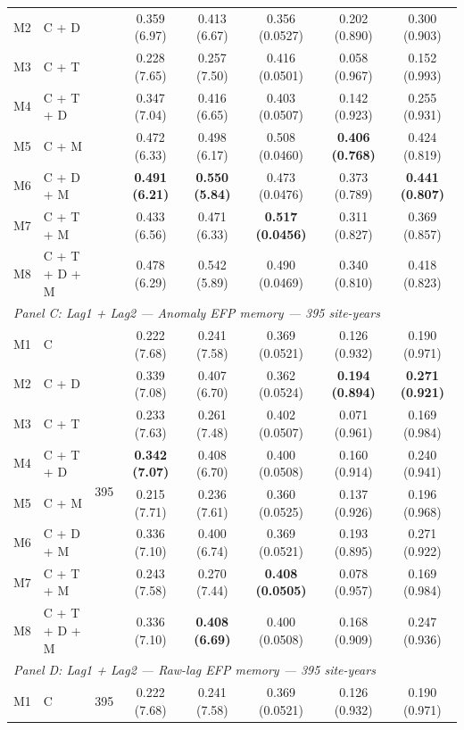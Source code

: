 \begin{table}[htbp]
\begin{tabular}{llcccccc}
M2 & C + D &  & 0.359 (6.97) & 0.413 (6.67) & 0.356 (0.0527) & 0.202 (0.890) & 0.300 (0.903) \\
M3 & C + T &  & 0.228 (7.65) & 0.257 (7.50) & 0.416 (0.0501) & 0.058 (0.967) & 0.152 (0.993) \\
M4 & C + T + D &  & 0.347 (7.04) & 0.416 (6.65) & 0.403 (0.0507) & 0.142 (0.923) & 0.255 (0.931) \\
M5 & C + M &  & 0.472 (6.33) & 0.498 (6.17) & 0.508 (0.0460) & \textbf{0.406 (0.768)} & 0.424 (0.819) \\
M6 & C + D + M &  & \textbf{0.491 (6.21)} & \textbf{0.550 (5.84)} & 0.473 (0.0476) & 0.373 (0.789) & \textbf{0.441 (0.807)} \\
M7 & C + T + M &  & 0.433 (6.56) & 0.471 (6.33) & \textbf{0.517 (0.0456)} & 0.311 (0.827) & 0.369 (0.857) \\
M8 & C + T + D + M &  & 0.478 (6.29) & 0.542 (5.89) & 0.490 (0.0469) & 0.340 (0.810) & 0.418 (0.823) \\
\midrule
\multicolumn{8}{l}{\textit{Panel C: Lag1 + Lag2 --- Anomaly EFP memory --- 395 site-years}} \\
\midrule
M1 & C & \multirow{8}{*}{395} & 0.222 (7.68) & 0.241 (7.58) & 0.369 (0.0521) & 0.126 (0.932) & 0.190 (0.971) \\
M2 & C + D &  & 0.339 (7.08) & 0.407 (6.70) & 0.362 (0.0524) & \textbf{0.194 (0.894)} & \textbf{0.271 (0.921)} \\
M3 & C + T &  & 0.233 (7.63) & 0.261 (7.48) & 0.402 (0.0507) & 0.071 (0.961) & 0.169 (0.984) \\
M4 & C + T + D &  & \textbf{0.342 (7.07)} & 0.408 (6.70) & 0.400 (0.0508) & 0.160 (0.914) & 0.240 (0.941) \\
M5 & C + M &  & 0.215 (7.71) & 0.236 (7.61) & 0.360 (0.0525) & 0.137 (0.926) & 0.196 (0.968) \\
M6 & C + D + M &  & 0.336 (7.10) & 0.400 (6.74) & 0.369 (0.0521) & 0.193 (0.895) & 0.271 (0.922) \\
M7 & C + T + M &  & 0.243 (7.58) & 0.270 (7.44) & \textbf{0.408 (0.0505)} & 0.078 (0.957) & 0.169 (0.984) \\
M8 & C + T + D + M &  & 0.336 (7.10) & \textbf{0.408 (6.69)} & 0.400 (0.0508) & 0.168 (0.909) & 0.247 (0.936) \\
\midrule
\multicolumn{8}{l}{\textit{Panel D: Lag1 + Lag2 --- Raw-lag EFP memory --- 395 site-years}} \\
\midrule
M1 & C & \multirow{8}{*}{395} & 0.222 (7.68) & 0.241 (7.58) & 0.369 (0.0521) & 0.126 (0.932) & 0.190 (0.971) \\

\end{tabular}
\end{table}
